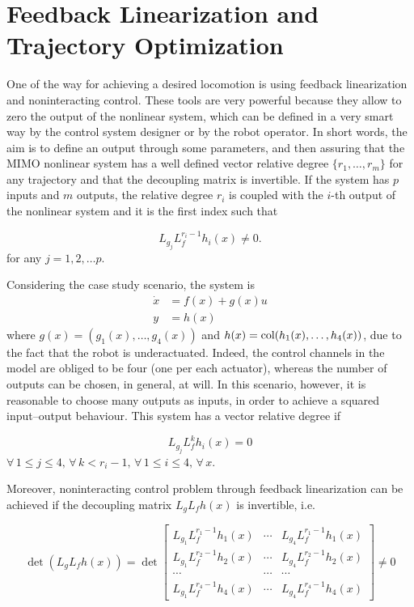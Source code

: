 \documentclass[11pt]{article}
\begin{document}
\section{Feedback Linearization and Trajectory Optimization}

One of the way for achieving a desired locomotion is using feedback linearization and noninteracting control. These tools are very powerful because they allow to zero the output of the nonlinear system, which can be defined in a very smart way by the control system designer or by the robot operator. In short words, the aim is to define an output through some parameters, and then assuring that the MIMO nonlinear system has a well defined vector relative degree $\{r_1,\dots,r_m\}$ for any trajectory and that the decoupling matrix is invertible. If the system has $p$ inputs and $m$ outputs, the relative degree $r_i$ is coupled with the $i$-th output of the nonlinear system and it is the first index such that

\[
L_{g_j}L_{f}^{r_i-1}h_i(x) \neq 0.
\]
for any $j = 1, 2, \dots p$.

Considering the case study scenario, the system is
\begin{equation}
\begin{split}
    \dot{x} & = f(x) + g(x)u \\
    y & = h(x)
\end{split}
\label{system}
\end{equation}
where $g(x) = (g_1(x),\dots,g_4(x))$ and $h(x) = \textup{col}(h_1(x),\dots,h_4(x))$, due to the fact that the robot is underactuated. Indeed, the control channels in the model are obliged to be four (one per each actuator), whereas the number of outputs can be chosen, in general, at will. In this scenario, however, it is reasonable to choose many outputs as inputs, in order to achieve a squared input--output behaviour. This system has a vector relative degree if

\begin{equation}
    L_{g_j}L_f^k h_i(x) = 0
    \label{relDeg}
\end{equation}
$\forall \, 1 \leq j \leq 4, \, \forall \, k < r_i - 1, \, \forall \, 1 \leq i \leq 4, \, \forall \, x$.

Moreover, noninteracting control problem through feedback linearization can be achieved if the decoupling matrix $L_gL_fh(x)$ is invertible, i.e.

\begin{equation}
\det(L_gL_fh(x)) = \det
    \begin{bmatrix}
        L_{g_1}L_f^{r_1-1}h_1(x) & \cdots & L_{g_4}L_f^{r_1-1}h_1(x) \\
        L_{g_1}L_f^{r_2-1}h_2(x) & \cdots & L_{g_4}L_f^{r_2-1}h_2(x) \\
        \cdots & \cdots & \cdots \\
        L_{g_1}L_f^{r_4-1}h_4(x) & \cdots & L_{g_4}L_f^{r_4-1}h_4(x)
    \end{bmatrix} \neq 0
    \label{nonInteractingControl}
\end{equation}
\end{document}

